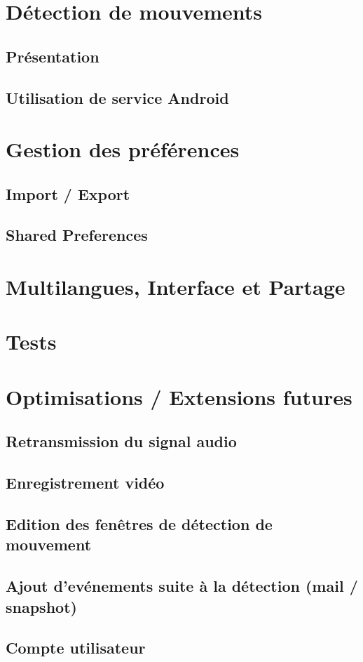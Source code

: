 \section{Détection de mouvements}
\subsection{Présentation}

\subsection{Utilisation de service Android}


\section{Gestion des préférences}
\subsection{Import / Export}

\subsection{Shared Preferences}

\section{Multilangues, Interface et Partage}

\section{Tests}

\section{Optimisations / Extensions futures}
\subsection{Retransmission du signal audio}
\subsection{Enregistrement vidéo}
\subsection{Edition des fenêtres de détection  de mouvement}
\subsection{Ajout d'evénements suite à la détection (mail / snapshot)}
\subsection{Compte utilisateur}
\clearpage
